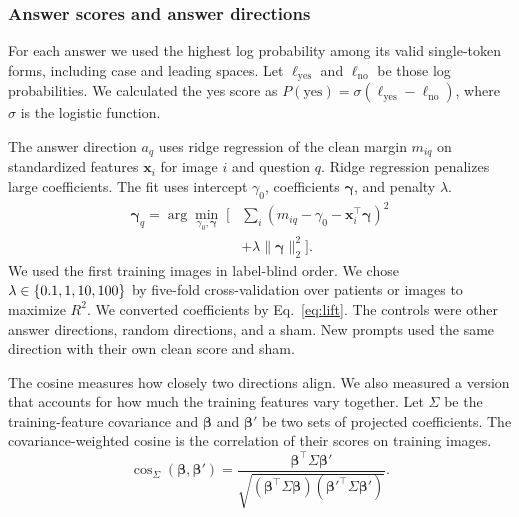\subsubsection{Answer scores and answer directions}
\label{sec:scoring-implementation}

For each answer we used the highest log probability among its valid single-token forms, including case and leading spaces. Let $\ell_{\mathrm{yes}}$ and $\ell_{\mathrm{no}}$ be those log probabilities. We calculated the yes score as $P(\mathrm{yes})=\sigma(\ell_{\mathrm{yes}}-\ell_{\mathrm{no}})$, where $\sigma$ is the logistic function.

The answer direction $a_q$ uses ridge regression of the clean margin $m_{iq}$ on standardized features $\boldsymbol x_i$ for image $i$ and question $q$. Ridge regression penalizes large coefficients. The fit uses intercept $\gamma_0$, coefficients $\boldsymbol\gamma$, and penalty $\lambda$.
\begin{equation}
\begin{split}
\boldsymbol\gamma_q=\arg\min_{\gamma_0,\boldsymbol\gamma}\;\bigg[
 &\sum_i (m_{iq}-\gamma_0-\boldsymbol x_i^\top\boldsymbol\gamma)^2\\
 &+\lambda\lVert\boldsymbol\gamma\rVert_2^2\bigg].
\end{split}
\label{eq:answer-direction}
\end{equation}
We used the first \jnAnswerDirectionFitRows{} training images in label-blind order. We chose $\lambda\in\{0.1,1,10,100\}$ by five-fold cross-validation over patients or images to maximize $R^2$. We converted coefficients by Eq.~\ref{eq:lift}. The controls were other answer directions, random directions, and a sham. New prompts used the same direction with their own clean score and sham.

The cosine measures how closely two directions align. We also measured a version that accounts for how much the training features vary together.\cite{park2024linear} Let $\Sigma$ be the training-feature covariance and $\boldsymbol\beta$ and $\boldsymbol\beta'$ be two sets of projected coefficients. The covariance-weighted cosine is the correlation of their scores on training images.
\begin{equation}
\cos_\Sigma(\boldsymbol\beta,\boldsymbol\beta')
=\frac{\boldsymbol\beta^\top\Sigma\boldsymbol\beta'}
{\sqrt{(\boldsymbol\beta^\top\Sigma\boldsymbol\beta)
        (\boldsymbol\beta'^\top\Sigma\boldsymbol\beta')}}.
\label{eq:whitened-cos}
\end{equation}

